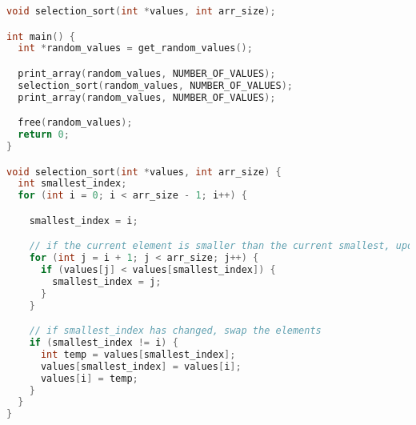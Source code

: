 \documentclass[11pt]{article}
\begin{document}
\begin{lstlisting}[language=C]
void selection_sort(int *values, int arr_size);

int main() {
  int *random_values = get_random_values();

  print_array(random_values, NUMBER_OF_VALUES);
  selection_sort(random_values, NUMBER_OF_VALUES);
  print_array(random_values, NUMBER_OF_VALUES);

  free(random_values);
  return 0;
}

void selection_sort(int *values, int arr_size) {
  int smallest_index;
  for (int i = 0; i < arr_size - 1; i++) {

    smallest_index = i;

    // if the current element is smaller than the current smallest, update smallest_index
    for (int j = i + 1; j < arr_size; j++) {
      if (values[j] < values[smallest_index]) {
        smallest_index = j;
      }
    }

    // if smallest_index has changed, swap the elements
    if (smallest_index != i) {
      int temp = values[smallest_index];
      values[smallest_index] = values[i];
      values[i] = temp;
    }
  }
}
\end{lstlisting}
\end{document}
